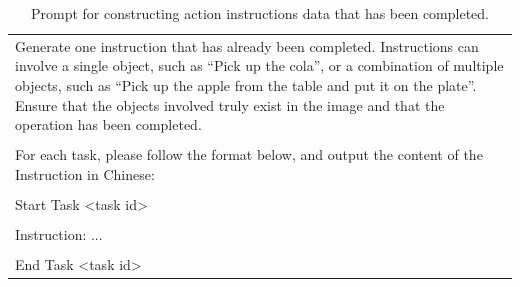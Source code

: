 \begin{table}[h!]
\begin{minipage}{0.99\columnwidth}
\begin{tcolorbox}
\begin{tabular}{p{}}
Generate one instruction that has already been completed. Instructions can involve a single object, such as ``Pick up the cola'', or a combination of multiple objects, such as ``Pick up the apple from the table and put it on the plate''. Ensure that the objects involved truly exist in the image and that the operation has been completed. \\
\\
For each task, please follow the format below, and output the content of the Instruction in Chinese: \\
\\
Start Task \textless task id\textgreater \\
\\
Instruction: ... \\
\\
End Task \textless task id\textgreater
    \end{tabular}
\end{tcolorbox}
\vspace{-2mm}
\caption{Prompt for constructing action instructions data that has been completed.}
    \label{tab:prompt4}
\end{minipage}
\end{table}
